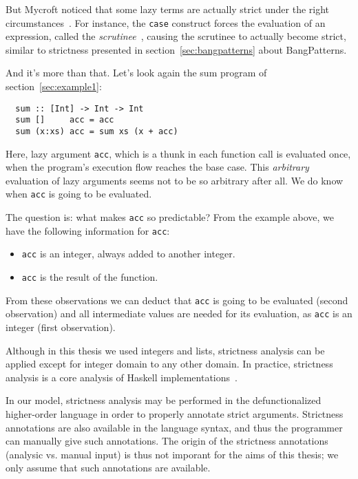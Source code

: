 \documentclass[diploma]{softlab-thesis}
\begin{document}
But Mycroft
noticed that some lazy terms are actually strict under the right circumstances~\cite{Mycroft:1980:TPT:647324.721526}. For instance, the \texttt{case} 
construct forces the evaluation of an expression, called the \emph{scrutinee}~\cite{PeytonJones94}, causing the scrutinee to actually become strict, 
similar to strictness presented in section~\ref{sec:bangpatterns} about BangPatterns. 

And it's more than that. Let's look again the sum program of section~\ref{sec:example1}:
\begin{verbatim}
  sum :: [Int] -> Int -> Int
  sum []     acc = acc
  sum (x:xs) acc = sum xs (x + acc)
\end{verbatim}

Here, lazy argument \texttt{acc}, which is a thunk in each function call is evaluated once, when the program's 
execution flow reaches the base case. This \textit{arbitrary} evaluation of lazy arguments seems not to 
be so arbitrary after all. We do know when \texttt{acc} is going to be evaluated.

The question is: what makes \texttt{acc} so predictable? From the example above, we have the following information for \texttt{acc}:
\begin{itemize}
  \item \texttt{acc} is an integer, always added to another integer.
  \item \texttt{acc} is the result of the function.
\end{itemize}

From these observations we can deduct that \texttt{acc} is going to be evaluated (second observation) and 
all intermediate values are needed for its evaluation, as \texttt{acc} is an integer (first observation).

Although in this thesis we used integers and lists, strictness
analysis can be applied except for integer domain to any other domain. In practice, strictness analysis is a
core analysis of Haskell
implementations~\cite{PeytonJones:1991:UVF:645420.652528,burn:lemetayer:1996,Holdermans:2010:MSM:2088270.2088274}.

In our model, strictness analysis may be performed in the
defunctionalized higher-order language in order to properly annotate
strict arguments. Strictness annotations are also available in the
language syntax, and thus the programmer can manually give such
annotations. The origin of the strictness annotations (analysic
vs. manual input) is thus not imporant for the aims of this thesis; we
only assume that such annotations are available.
\end{document}
